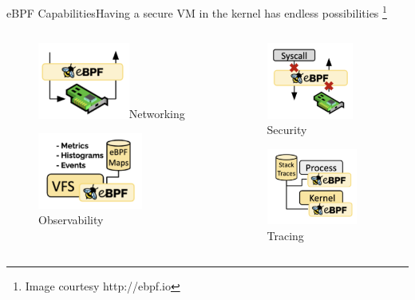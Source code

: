 \documentclass{beamer}
\begin{document}
\begin{frame}{eBPF Capabilities}{Having a secure VM in the kernel has endless possibilities \footnote{Image courtesy http://ebpf.io}}
\begin{columns}
\begin{column}{0.5\textwidth}
\begin{figure}
    \centering
    \includegraphics[height=2.5cm]{e_networking.png}\newline Networking
\end{figure}
\begin{figure}
    \centering
    \includegraphics[height=2.5cm]{e_olly.png}\newline Observability
\end{figure}

\end{column}

\begin{column}{0.5\textwidth}
\begin{figure}
    \centering
    \includegraphics[height=2.5cm]{e_sec.png}\newline Security
\end{figure}
\begin{figure}
    \centering
    \includegraphics[height=2.5cm]{e_tracing.png}\newline Tracing
\end{figure}

\end{column}
\end{columns}
\end{frame}
\end{document}
